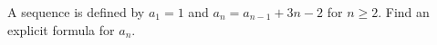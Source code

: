 A sequence is defined by $a_1=1$ and $a_n=a_{n-1}+3n-2$ for $n\ge2$. Find an explicit formula for $a_n$.
